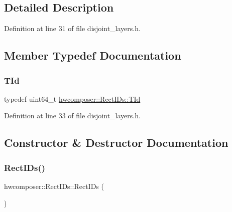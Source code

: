 \subsection{Detailed Description}


Definition at line 31 of file disjoint\+\_\+layers.\+h.



\subsection{Member Typedef Documentation}
\mbox{\label{structhwcomposer_1_1RectIDs_a53423437c946ca00a75cde5c4d199c6f}} 
\subsubsection{\texorpdfstring{T\+Id}{TId}}
{\footnotesize\ttfamily typedef uint64\+\_\+t \mbox{\hyperlink{structhwcomposer_1_1RectIDs_a53423437c946ca00a75cde5c4d199c6f}{hwcomposer\+::\+Rect\+I\+Ds\+::\+T\+Id}}}



Definition at line 33 of file disjoint\+\_\+layers.\+h.



\subsection{Constructor \& Destructor Documentation}
\mbox{\label{structhwcomposer_1_1RectIDs_a8082a18e364f9e423d5e0cfdd0b98256}} 
\subsubsection{\texorpdfstring{Rect\+I\+Ds()}{RectIDs()}\hspace{0.1cm}{\footnotesize\ttfamily [1/2]}}
{\footnotesize\ttfamily hwcomposer\+::\+Rect\+I\+Ds\+::\+Rect\+I\+Ds (\begin{DoxyParamCaption}{ }\end{DoxyParamCaption})\hspace{0.3cm}{\ttfamily [inline]}}



